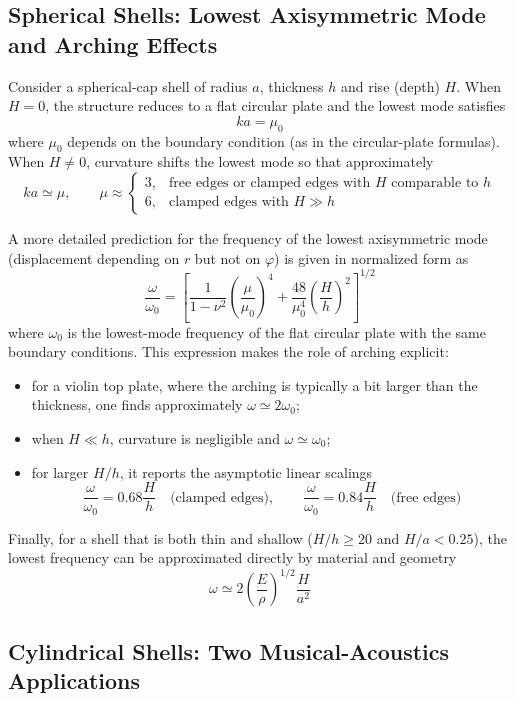 \subsection{Spherical Shells: Lowest Axisymmetric Mode and Arching Effects}

Consider a spherical-cap shell of radius \( a \), thickness \( h \) and rise (depth) \( H \). When \( H = 0 \), the structure reduces to a flat circular plate and the lowest mode satisfies
\[
ka = \mu_0
\]
where \( \mu_0 \) depends on the boundary condition (as in the circular-plate formulas). When \( H\neq 0 \), curvature shifts the lowest mode so that approximately
\[
ka  \simeq \mu,
\qquad
\mu \approx
\begin{cases}
3, & \text{free edges or clamped edges with } H \text{ comparable to } h\\
6, & \text{clamped edges with } H \gg h
\end{cases}
\]

A more detailed prediction for the frequency of the lowest axisymmetric mode (displacement depending on \( r \) but not on \( \varphi \)) is given in normalized form as
\[
\frac{\omega}{\omega_0}
 = 
\left[
\frac{1}{1-\nu^{2}}\left(\frac{\mu}{\mu_0}\right)^{4}
+
\frac{48}{\mu_0^{4}}\left(\frac{H}{h}\right)^{2}
\right]^{1/2}
\]
where \( \omega_0 \) is the lowest-mode frequency of the flat circular plate with the same boundary conditions. This expression makes the role of arching explicit:

\begin{itemize}
    \item for a violin top plate, where the arching is typically a bit larger than the thickness, one finds approximately \( \omega  \simeq 2\omega_0 \);
    \item when \( H \ll h \), curvature is negligible and \( \omega \simeq \omega_0 \);
    \item for larger \( H/h \), it reports the asymptotic linear scalings
    \[
    \frac{\omega}{\omega_0} = 0.68\frac{H}{h}\quad \text{(clamped edges)},
    \qquad
    \frac{\omega}{\omega_0} = 0.84\frac{H}{h}\quad \text{(free edges)}
    \]
\end{itemize}

Finally, for a shell that is both thin and shallow (\( H/h\ge 20 \) and \( H/a<0.25 \)), the lowest frequency can be approximated directly by material and geometry
\[
\omega \simeq 2\left(\frac{E}{\rho}\right)^{1/2}\frac{H}{a^{2}}
\]

\subsection{Cylindrical Shells: Two Musical-Acoustics Applications}

